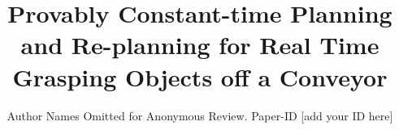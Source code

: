 \documentclass[conference]{IEEEtran}
\begin{document}
\title{Provably Constant-time Planning and Re-planning for Real Time Grasping Objects off a Conveyor}

\author{Author Names Omitted for Anonymous Review. Paper-ID [add your ID here]}





% 


\maketitle
\end{document}
